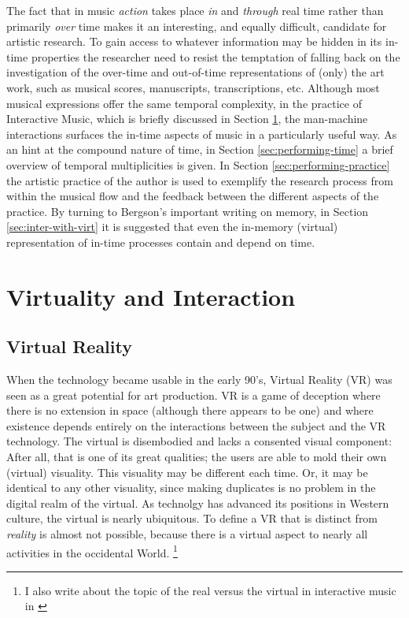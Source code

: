 The fact that in music \emph{action} takes place \emph{in} and \emph{through} real time rather than primarily \emph{over} time makes it an interesting, and equally difficult, candidate for artistic research. To gain access to whatever information may be hidden in its in-time properties the researcher need to resist the temptation of falling back on the investigation of the over-time and out-of-time representations of (only) the art work, such as musical scores, manuscripts, transcriptions, etc. Although most musical expressions offer the same temporal complexity, in the practice of Interactive Music, which is briefly discussed in Section \ref{sec:why-interaction}, the man-machine interactions surfaces the in-time aspects of music in a particularly useful way. As an hint at the compound nature of time, in Section \ref{sec:performing-time} a brief overview of temporal multiplicities is given. In Section \ref{sec:performing-practice} the artistic practice of the author is used to exemplify the research process from within the musical flow and the feedback between the different aspects of the practice. By turning to Bergson's important writing on memory, in Section \ref{sec:inter-with-virt} it is suggested that even the in-memory (virtual) representation of in-time processes contain and depend on time.

\section{Virtuality and Interaction}
\label{sec:why-interaction}

\subsection*{Virtual Reality}
\label{sec:virtual-reality}

When the technology became usable in the early 90's, Virtual Reality (VR) was seen as a great potential for art production. \parencite[See for example:][]{moser96,wood98,dixon07} VR is a game of deception where there is no extension in space (although there appears to be one) and where existence depends entirely on the interactions between the subject and the VR technology. The virtual is disembodied and lacks a consented visual component: After all, that is one of its great qualities; the users are able to mold their own (virtual) visuality. \parencite[Compare to William Gibson's definition of Cyberspace as a ``consensual hallucination'':][51]{gibson84} This visuality may be different each time. Or, it may be identical to any other visuality, since making duplicates is no problem in the digital realm of the virtual. As technolgy has advanced its positions in Western culture, the virtual is nearly ubiquitous. To define a VR that is distinct from \emph{reality} is almost not possible, because there is a virtual aspect to nearly all activities in the occidental World. \parencite[See][]{baudrillard02:screened}\footnote{I also write about the topic of the real versus the virtual in interactive music in \parencite[ch. 4]{frisk08}} 

